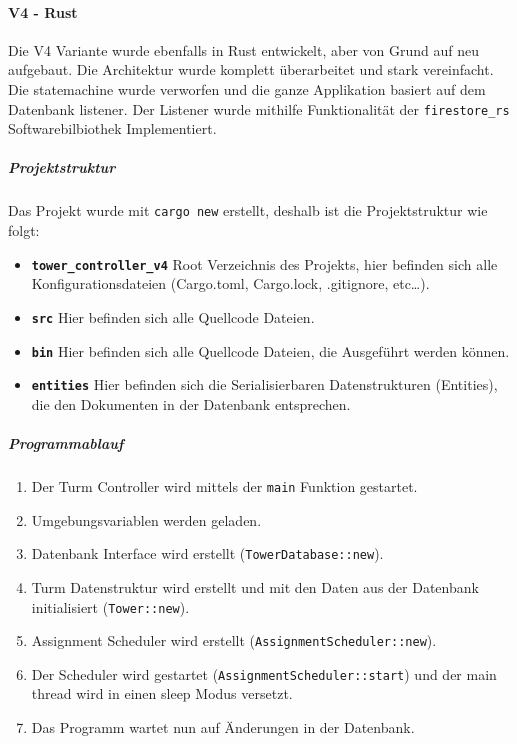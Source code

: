 \paragraph{V4 - Rust}

Die V4 Variante wurde ebenfalls in Rust entwickelt, aber von Grund auf neu aufgebaut. Die Architektur wurde komplett überarbeitet und stark vereinfacht. Die \Gls{statemachine} wurde verworfen und die ganze Applikation basiert auf dem Datenbank \Gls{listener}. Der Listener wurde mithilfe Funktionalität der \texttt{firestore\_rs} Softwarebilbiothek Implementiert.

\subparagraph{Projektstruktur}

Das Projekt wurde mit \texttt{cargo new} erstellt, deshalb ist die Projektstruktur wie folgt:


\begin{itemize}
  \item \textbf{\texttt{tower\_controller\_v4}} Root Verzeichnis des Projekts, hier befinden sich alle    Konfigurationsdateien (Cargo.toml, Cargo.lock, .gitignore, etc\ldots{}).
  \item \textbf{\texttt{src}} Hier befinden sich alle Quellcode Dateien.
  \item \textbf{\texttt{bin}} Hier befinden sich alle Quellcode Dateien, die Ausgeführt werden können.
  \item \textbf{\texttt{entities}} Hier befinden sich die Serialisierbaren Datenstrukturen (Entities), die den Dokumenten in der Datenbank entsprechen.
\end{itemize}

\subparagraph{Programmablauf}
\begin{enumerate}
  \item Der Turm Controller wird mittels der \texttt{main} Funktion gestartet.
  \item Umgebungsvariablen werden geladen.
  \item Datenbank Interface wird erstellt (\texttt{TowerDatabase::new}).
  \item Turm Datenstruktur wird erstellt und mit den Daten aus der Datenbank initialisiert (\texttt{Tower::new}).
  \item Assignment Scheduler wird erstellt (\texttt{AssignmentScheduler::new}).
  \item Der Scheduler wird gestartet (\texttt{AssignmentScheduler::start}) und der main \Gls{thread} wird in einen \Gls{sleep} Modus versetzt.
  \item Das Programm wartet nun auf Änderungen in der Datenbank.
\end{enumerate}

